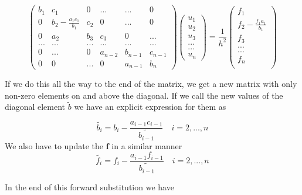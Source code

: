 \documentclass[a4paper,11pt]{article}
\begin{document}
{\begin{equation}
\begin{pmatrix}
b_1 & c_1 & 0 & ... & ... & 0 \\
0 & b_2-\frac{a_1 c_1}{b_1} & c_2 & 0 & ... & 0 \\
0 & a_2 & b_3 & c_3 & 0 & ... \\
... & ... & ... & ... & ... & ... \\
0 & ... & 0 & a_{n-2} & b_{n-1} & c_{n-1} \\
0 & 0 & ... & 0 & a_{n-1} & b_{n} 
\end{pmatrix} \begin{pmatrix}
u_1\\
u_2\\
u_3\\
...\\
...\\
u_n
\end{pmatrix} = \frac{1}{h^2}\begin{pmatrix}
f_1 \\
f_2-\frac{f_1 a_1}{b_1} \\
f_3 \\
... \\
... \\
f_n \\
\end{pmatrix}
\end{equation}

If we do this all the way to the end of the matrix, we get a new matrix with only non-zero elements on and above the diagonal. If we call the new values of the diagonal element $\tilde{b}$ we have an explicit expression for them as

\begin{equation}
	\tilde{b_i}=b_{i}-\frac{a_{i-1}c_{i-1}}{\tilde{b_{i-1}}}\quad i = 2, ..., n
	\label{eq:forward_general_b}
\end{equation}
We also have to update the $\mathbf{f}$ in a similar manner
\begin{equation}
	\tilde{f_i}=f_{i}-\frac{a_{i-1}f_{i-1}}{\tilde{b_{i-1}}}\quad i = 2, ..., n
	\label{eq:forward_general_f}
\end{equation}

In the end of this forward substitution we have

}
\end{document}

